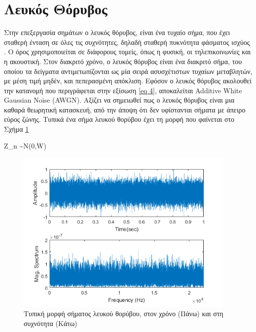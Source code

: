 \section{Λευκός Θόρυβος} \label{sec:white_noise}

Στην επεξεργασία σημάτων ο λευκός θόρυβος, είναι ένα τυχαίο σήμα, που έχει σταθερή ένταση σε όλες τις συχνότητες, δηλαδή σταθερή πυκνότητα φάσματος ισχύος \cite{Carter2009}. Ο όρος χρησιμοποιείται σε διάφορους τομείς, όπως η φυσική, οι τηλεπικοινωνίες και η ακουστική. Στον διακριτό χρόνο, ο λευκός θόρυβος είναι ένα διακριτό σήμα, του οποίου τα δείγματα αντιμετωπίζονται ως μία σειρά ασυσχέτιστων τυχαίων μεταβλητών, με μέση τιμή μηδέν, και πεπερασμένη απόκλιση. Εφόσον ο λευκός θόρυβος ακολουθεί την κατανομή που περιγράφεται στην εξίσωση \ref{eq 4}, αποκαλείται Additive White Gaussian Noise (AWGN). Αξίζει να σημειωθεί πως ο λευκός θόρυβος είναι μια καθαρά θεωρητική κατασκευή, από την άποψη ότι δεν υφίστανται σήματα με άπειρο εύρος ζώνης. Τυπικά ένα σήμα λευκού θορύβου έχει τη μορφή που φαίνεται στο Σχήμα \ref{fig:typical_white_noise}

\begin{CEquation}
    Z_n \sim N(0,W) \label{eq 4}
\end{CEquation}

\begin{figure}[h]
  \centering
  \includegraphics[width=\textwidth, height=8cm]{images/typical_white_noise.png}
  \caption{Τυπική μορφή σήματος λευκού θορύβου, στον χρόνο (Πάνω) και στη συχνότητα (Κάτω)}
  \label{fig:typical_white_noise}
\end{figure}
